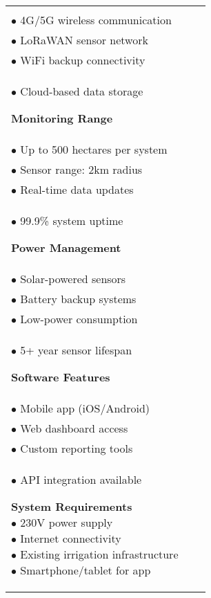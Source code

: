 \documentclass[a4paper,landscape]{article}
\begin{document}
\begin{tabular}{|p{8.5cm}|p{8.5cm}|p{8.5cm}|}
\begin{minipage}[t]{8cm}
\vspace{0.5cm}

{\Large \textcolor{wetblue}{\textbf{Technical Specifications}}}

\vspace{0.5cm}

{\large \textcolor{wetgreen}{\textbf{Connectivity}}}\\
\small
$\bullet$ 4G/5G wireless communication\\
$\bullet$ LoRaWAN sensor network\\
$\bullet$ WiFi backup connectivity\\
$\bullet$ Cloud-based data storage

\vspace{0.4cm}

{\large \textcolor{wetgreen}{\textbf{Monitoring Range}}}\\
\small
$\bullet$ Up to 500 hectares per system\\
$\bullet$ Sensor range: 2km radius\\
$\bullet$ Real-time data updates\\
$\bullet$ 99.9\% system uptime

\vspace{0.4cm}

{\large \textcolor{wetgreen}{\textbf{Power Management}}}\\
\small
$\bullet$ Solar-powered sensors\\
$\bullet$ Battery backup systems\\
$\bullet$ Low-power consumption\\
$\bullet$ 5+ year sensor lifespan

\vspace{0.4cm}

{\large \textcolor{wetgreen}{\textbf{Software Features}}}\\
\small
$\bullet$ Mobile app (iOS/Android)\\
$\bullet$ Web dashboard access\\
$\bullet$ Custom reporting tools\\
$\bullet$ API integration available

\vspace{0.5cm}

\colorbox{wetlightgreen}{\parbox{7cm}{
\centering
\textcolor{wetblue}{\textbf{System Requirements}}\\[0.2cm]
\textcolor{wetgreen}{$\bullet$ 230V power supply}\\
\textcolor{wetblue}{$\bullet$ Internet connectivity}\\
\textcolor{wetgreen}{$\bullet$ Existing irrigation infrastructure}\\
\textcolor{wetblue}{$\bullet$ Smartphone/tablet for app}
}}


\end{minipage}
\end{tabular}
\end{document}
